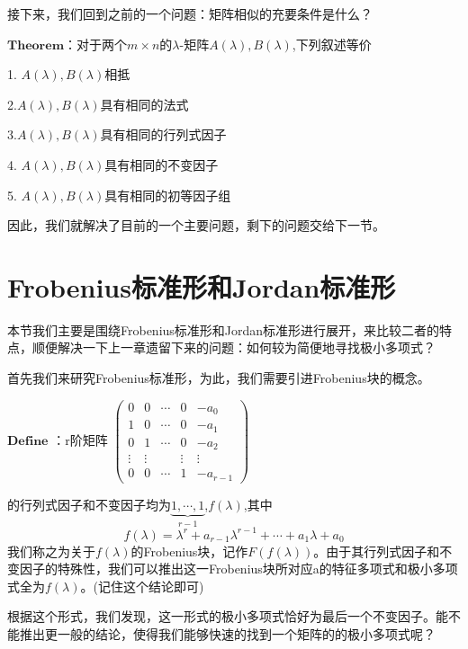 \documentclass[lang=cn,10pt]{elegantbook}
\begin{document}
接下来，我们回到之前的一个问题：矩阵相似的充要条件是什么？

$\mathbf{Theorem}$：对于两个$m\times n$的$\lambda$-矩阵$\mathit{A(\lambda),B(\lambda)}$,下列叙述等价

1. $\mathit{A(\lambda),B(\lambda)}$相抵

2.$\mathit{A(\lambda),B(\lambda)}$具有相同的法式

3.$\mathit{A(\lambda),B(\lambda)}$具有相同的行列式因子

4. $\mathit{A(\lambda),B(\lambda)}$具有相同的不变因子

5. $\mathit{A(\lambda),B(\lambda)}$具有相同的初等因子组

因此，我们就解决了目前的一个主要问题，剩下的问题交给下一节。~\\




\section{Frobenius标准形和Jordan标准形}

本节我们主要是围绕Frobenius标准形和Jordan标准形进行展开，来比较二者的特点，顺便解决一下上一章遗留下来的问题：如何较为简便地寻找极小多项式？

首先我们来研究Frobenius标准形，为此，我们需要引进Frobenius块的概念。

$\mathbf{Define}$ ：r阶矩阵
$
\begin{pmatrix}
	0& 0 & \cdots   &0  & -a_{0} \\
	1& 0 & \cdots  & 0 & -a_{1} \\
	0& 1 &\cdots   & 0 &-a_{2}  \\
	\vdots & \vdots &   &  \vdots& \vdots\\
	0& 0 & \cdots & 1 &-a_{r-1} 
\end{pmatrix}$

的行列式因子和不变因子均为$\underset{r-1}{\underbrace{1,\cdots ,1} } $,$\mathit{f(\lambda)}$,其中
\begin{equation*}
	\mathit{f(\lambda)}=\lambda^{r}+a_{r-1}\lambda^{r-1}+\cdots+a_{1}\lambda+a_{0}
\end{equation*}
我们称之为关于$\mathit{f(\lambda)}$的Frobenius块，记作$\mathit{F(f(\lambda))}$。由于其行列式因子和不变因子的特殊性，我们可以推出这一Frobenius块所对应a的特征多项式和极小多项式全为$\mathit{f(\lambda)}$。(记住这个结论即可)

根据这个形式，我们发现，这一形式的极小多项式恰好为最后一个不变因子。能不能推出更一般的结论，使得我们能够快速的找到一个矩阵的的极小多项式呢？
\end{document}
